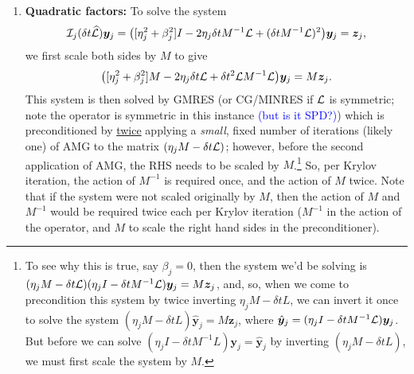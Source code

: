 \documentclass[review]{siamart}
\newcommand{\tcb}{\textcolor{blue}}
\begin{document}
\begin{enumerate}
\item \textbf{Quadratic factors:} To solve the system
\begin{align}
{\cal I}_j(\delta t \widehat{\cal L}) \bm{y}_j 
=
\big( [\eta_j^2 + \beta_j^2] I - 2 \eta_j \delta t M^{-1} {\cal L} + (\delta t M^{-1} {\cal L})^2 \big) \bm{y}_j
= \bm{z}_j,
\end{align}
we first scale both sides by $M$ to give
\begin{align}
\big( [\eta_j^2 + \beta_j^2] M - 2 \eta_j \delta t {\cal L} + \delta t^2 {\cal L} M^{-1} {\cal L} \big) \bm{y}_j
= M \bm{z}_j.
\end{align}
This system is then solved by GMRES (or CG/MINRES if ${\cal L}$ is symmetric; note the operator is symmetric in this instance \tcb{(but is it SPD?)}) which is preconditioned by \underline{twice} applying a \textit{small}, fixed number of iterations (likely one) of AMG to the matrix $(\eta_j M -  \delta t {\cal L})$; however, before the second application of AMG, the RHS needs to be scaled by $M$.\footnote{To see why this is true, say $\beta_j = 0$, then the system we'd be solving is $(\eta_j M - \delta t {\cal L}) (\eta_j I - \delta t M^{-1} {\cal L}) \bm{y}_j = M \bm{z}_j$, and, so, when we come to precondition this system by twice inverting $\eta_j M - \delta t L$, we can invert it once to solve the system $(\eta_j M - \delta t L) \hat{\bm{y}}_j =  M \bm{z}_j$, where $\hat{\bm{y}}_j = (\eta_j I - \delta t M^{-1} {\cal L}) \bm{y}_j$. But before we can solve $(\eta_j I - \delta t M^{-1} L) \bm{y}_j = \hat{\bm{y}}_j$ by inverting $(\eta_j M - \delta t L)$, we must first scale the system by $M$.} So, per Krylov iteration, the action of $M^{-1}$ is required once, and the action of $M$ twice. Note that if the system were not scaled originally by $M$, then the action of $M$ and $M^{-1}$ would be required twice each per Krylov iteration ($M^{-1}$ in the action of the operator, and $M$ to scale the right hand sides in the preconditioner).
\end{enumerate}
\end{document}
